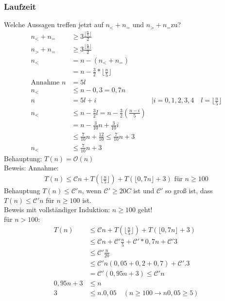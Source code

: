 \subsubsection{Laufzeit}
Welche Aussagen treffen jetzt auf $n_<+n_=$ und $n_> + n_=$zu?
\begin{align*}
n_< + n_= &\geq 3\frac{\lfloor \frac{n}{5} \rfloor}{2}\\
n_> + n_= &\geq 3\frac{\lfloor \frac{n}{5} \rfloor}{2}\\
n_< &= n-(n_< + n_=)\\
&= n- \frac{3}{2} * \lfloor \frac{n}{5} \rfloor\\
\text{Annahme } n&=5l\\
n_< & \leq n - 0,3 = 0,7n\\
n &= 5l + i &| i = 0,1,2,3,4 \quad l = \lfloor \frac{n}{5} \rfloor\\
n_< &\leq n-\frac{3}{2}l = n-\frac{3}{2}(\frac{n-i}{5})\\
&=n-\frac{3}{10}n + \frac{3}{10}i\\
&\leq \frac{7}{10}n + \frac{12}{10} \leq \frac{7}{10}n+3\\
n_< &\leq \frac{7}{10	}n+3
\end{align*}
Behauptung: $T(n) = \mathcal{O}(n)$\\
Beweis: Annahme:
\begin{align*}
T(n) \leq \mathcal{C}n+T(\lfloor \frac{n}{5} \rfloor) + T(\lfloor 0,7n \rfloor + 3) \text{ für } n \geq 100
\end{align*}
Behauptung $T(n) \leq \mathcal{C}'n$, wenn $\mathcal{C}'\geq 20C$ ist und $\mathcal{C}'$ so groß ist, dass $T(n) \leq \mathcal{C}'n$ für $n \geq 100$ ist.\\
Beweis mit vollständiger Induktion: $n \geq 100$ geht!\\
für $n > 100$:
\begin{align*}
T(n) &\leq \mathcal{C} n + T(\lfloor \frac{n}{5} \rfloor) + T(\lfloor 0,7n \rfloor+3)\\
&\leq \mathcal{C}n + \mathcal{C}' \frac{n}{5} + \mathcal{C}' * 0,7n + \mathcal{C}'3\\
&\leq \mathcal{C'}\frac{n}{20}\\
&\leq \mathcal{C}'n(0,05 + 0,2 + 0,7) + \mathcal{C'}.3\\
&=\mathcal{C}'(0,95n + 3) \leq \mathcal{C}'n\\
0,95n + 3 &\leq n\\
3 &\leq n.0,05 \quad (n \geq 100 \rightarrow n0,05 \geq 5)\\
\end{align*}